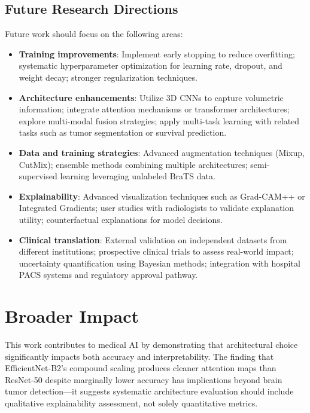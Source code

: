 \subsection{Future Research Directions}

Future work should focus on the following areas:

\begin{itemize}
    \item \textbf{Training improvements}: Implement early stopping to reduce overfitting; systematic hyperparameter optimization for learning rate, dropout, and weight decay; stronger regularization techniques.

    \item \textbf{Architecture enhancements}: Utilize 3D CNNs to capture volumetric information; integrate attention mechanisms or transformer architectures; explore multi-modal fusion strategies; apply multi-task learning with related tasks such as tumor segmentation or survival prediction.

    \item \textbf{Data and training strategies}: Advanced augmentation techniques (Mixup, CutMix); ensemble methods combining multiple architectures; semi-supervised learning leveraging unlabeled BraTS data.

    \item \textbf{Explainability}: Advanced visualization techniques such as Grad-CAM++ or Integrated Gradients; user studies with radiologists to validate explanation utility; counterfactual explanations for model decisions.

    \item \textbf{Clinical translation}: External validation on independent datasets from different institutions; prospective clinical trials to assess real-world impact; uncertainty quantification using Bayesian methods; integration with hospital PACS systems and regulatory approval pathway.
\end{itemize}

\section{Broader Impact}

This work contributes to medical AI by demonstrating that architectural choice significantly impacts both accuracy and interpretability. The finding that EfficientNet-B2's compound scaling produces cleaner attention maps than ResNet-50 despite marginally lower accuracy has implications beyond brain tumor detection—it suggests systematic architecture evaluation should include qualitative explainability assessment, not solely quantitative metrics.

